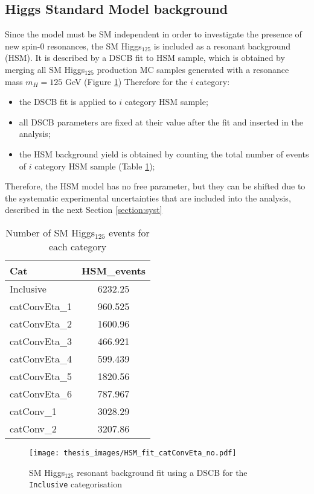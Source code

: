\documentclass[a4paper, oneside, 11pt, openright]{book}
\begin{document}
 			\subsection{Higgs Standard Model background}
 				Since the model must be SM independent in order to investigate the presence of new spin-0 resonances, the SM Higgs$_{125}$ is included as a resonant background (HSM). It is described by a DSCB fit to HSM sample, which is obtained by merging all SM Higgs$_{125}$ production MC samples generated with a resonance mass $m_H=125$ GeV (Figure \ref{fig:HSM_fit}) Therefore for the $i$ category:
 				\begin{itemize}
 					\item the DSCB fit is applied to $i$ category HSM sample;
 					\item all DSCB parameters are fixed at their value after the fit and inserted in the analysis;
 					\item the HSM background yield is obtained by counting the total number of events of $i$ category HSM sample (Table \ref{tab:HSM});
 				\end{itemize}  
 				Therefore, the HSM model has no free parameter, but they can be shifted due to the systematic experimental uncertainties that are included into the analysis, described in the next Section \ref{section:syst}
 				\begin{table}
 					\centering
						\begin{tabular}{lc}
							\toprule[1.5pt]
							Cat &  HSM\_events \\
							\midrule
							Inclusive & 6232.25 \\
							\midrule
							catConvEta\_1 & 960.525 \\
							catConvEta\_2 & 1600.96 \\
							catConvEta\_3 & 466.921 \\
							catConvEta\_4 & 599.439 \\
							catConvEta\_5 & 1820.56 \\
							catConvEta\_6 & 787.967\\
							\midrule
							catConv\_1 & 3028.29 \\
							catConv\_2 & 3207.86 \\
							\bottomrule[1.5pt]
						\end{tabular}
 					\caption{Number of SM Higgs$_{125}$ events for each category}
 					\label{tab:HSM}
 				\end{table}
 				\begin{figure}[]
 					\centering
 					\texttt{[image: thesis\_images/HSM\_fit\_catConvEta\_no.pdf]}
 					\caption{SM Higgs$_{125}$ resonant background fit using a DSCB for the \texttt{Inclusive} categorisation}
 					\label{fig:HSM_fit}
 				\end{figure}
 			
\end{document}
